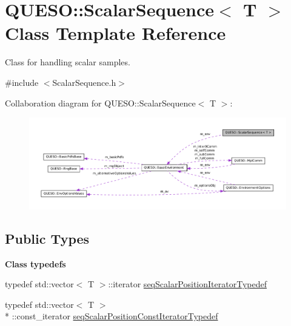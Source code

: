 \hypertarget{class_q_u_e_s_o_1_1_scalar_sequence}{\section{Q\-U\-E\-S\-O\-:\-:Scalar\-Sequence$<$ T $>$ Class Template Reference}
\label{class_q_u_e_s_o_1_1_scalar_sequence}
}


Class for handling scalar samples.  




{\ttfamily \#include $<$Scalar\-Sequence.\-h$>$}



Collaboration diagram for Q\-U\-E\-S\-O\-:\-:Scalar\-Sequence$<$ T $>$\-:
\nopagebreak
\begin{figure}[H]
\begin{center}
\leavevmode
\includegraphics[width=350pt]{class_q_u_e_s_o_1_1_scalar_sequence__coll__graph}
\end{center}
\end{figure}
\subsection*{Public Types}
\begin{Indent}{\bf Class typedefs}\par
\begin{DoxyCompactItemize}
\item 
typedef std\-::vector$<$ T $>$\-::iterator \hyperlink{class_q_u_e_s_o_1_1_scalar_sequence_a8366353bde8e82708560867520596d64}{seq\-Scalar\-Position\-Iterator\-Typedef}
\item 
typedef std\-::vector$<$ T $>$\\*
\-::const\-\_\-iterator \hyperlink{class_q_u_e_s_o_1_1_scalar_sequence_a1a43b88ee86997e3cc9c4f686ac3a359}{seq\-Scalar\-Position\-Const\-Iterator\-Typedef}
\end{DoxyCompactItemize}
\end{Indent}
